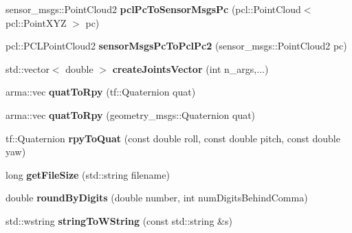 \begin{DoxyCompactItemize}
\item 
sensor\+\_\+msgs\+::\+Point\+Cloud2 {\bfseries pcl\+Pc\+To\+Sensor\+Msgs\+Pc} (pcl\+::\+Point\+Cloud$<$ pcl\+::\+Point\+X\+YZ $>$ pc)\hypertarget{namespacekukadu_aac131ec085769630ebda9ae56193e2ef}{}\label{namespacekukadu_aac131ec085769630ebda9ae56193e2ef}

\item 
pcl\+::\+P\+C\+L\+Point\+Cloud2 {\bfseries sensor\+Msgs\+Pc\+To\+Pcl\+Pc2} (sensor\+\_\+msgs\+::\+Point\+Cloud2 pc)\hypertarget{namespacekukadu_af44134c546de6ea5e498b083b8c131bc}{}\label{namespacekukadu_af44134c546de6ea5e498b083b8c131bc}

\item 
std\+::vector$<$ double $>$ {\bfseries create\+Joints\+Vector} (int n\+\_\+args,...)\hypertarget{namespacekukadu_a3252719e8d4e114800a6f2d058a5c005}{}\label{namespacekukadu_a3252719e8d4e114800a6f2d058a5c005}

\item 
arma\+::vec {\bfseries quat\+To\+Rpy} (tf\+::\+Quaternion quat)\hypertarget{namespacekukadu_a5766323b032df102647aad47a3bc0ecd}{}\label{namespacekukadu_a5766323b032df102647aad47a3bc0ecd}

\item 
arma\+::vec {\bfseries quat\+To\+Rpy} (geometry\+\_\+msgs\+::\+Quaternion quat)\hypertarget{namespacekukadu_abd631ac221ee68cac6807d75c12e3328}{}\label{namespacekukadu_abd631ac221ee68cac6807d75c12e3328}

\item 
tf\+::\+Quaternion {\bfseries rpy\+To\+Quat} (const double roll, const double pitch, const double yaw)\hypertarget{namespacekukadu_aae572ab857033784dd497034dfaf7dd3}{}\label{namespacekukadu_aae572ab857033784dd497034dfaf7dd3}

\item 
long {\bfseries get\+File\+Size} (std\+::string filename)\hypertarget{namespacekukadu_a298b58c8a4f14a525e51794dd0a23d34}{}\label{namespacekukadu_a298b58c8a4f14a525e51794dd0a23d34}

\item 
double {\bfseries round\+By\+Digits} (double number, int num\+Digits\+Behind\+Comma)\hypertarget{namespacekukadu_a1296de8cc04a6c5b28d47722b6cbdb3f}{}\label{namespacekukadu_a1296de8cc04a6c5b28d47722b6cbdb3f}

\item 
std\+::wstring {\bfseries string\+To\+W\+String} (const std\+::string \&s)\hypertarget{namespacekukadu_af9fedac63f76b969c8264646b7abd405}{}\label{namespacekukadu_af9fedac63f76b969c8264646b7abd405}


\end{DoxyCompactItemize}
